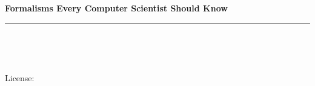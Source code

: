 \frontmatter

\begin{titlepage}
    \begin{flushleft}

    \textbf{\fontsize{48}{54}\selectfont Formalisms Every Computer Scientist Should Know\\}

    \par\noindent\rule{\textwidth}{4pt}\\

    \vspace{\fill}

    \textbf{\large \bookauthor}\\[3.5pt]
    \textbf{\large \textit{\authorsubtitle}}

    \vspace{\fill}

    \end{flushleft}
    \begin{flushleft}
        \vspace{\fill}
        License: \booklicense
    \end{flushleft}
\end{titlepage}

\setcounter{tocdepth}{3}
\tableofcontents


